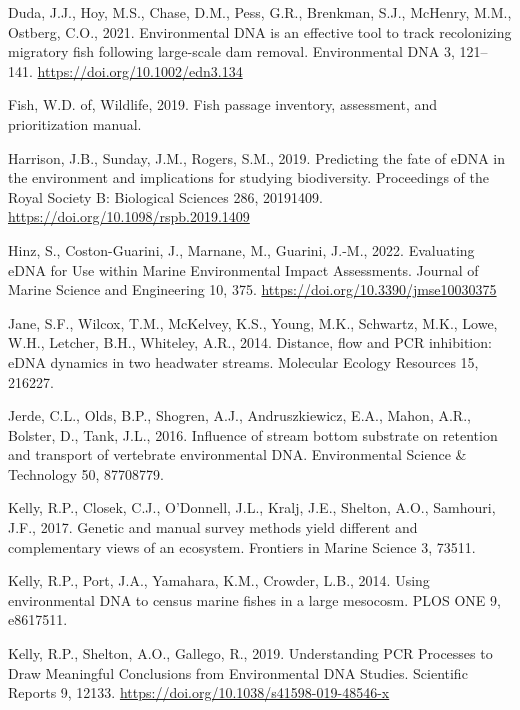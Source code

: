 \documentclass[
]{article}
\newlength{\cslhangindent}
\newlength{\cslentryspacingunit} %
\newenvironment{CSLReferences}[2] %
 {%
  \setlength{\parindent}{0pt}
  \ifodd #1
  \let\oldpar\par
  \def\par{\hangindent=\cslhangindent\oldpar}
  \fi
  \setlength{\parskip}{#2\cslentryspacingunit}
 }%
 {}
\begin{document}
\begin{CSLReferences}{1}{0}
\leavevmode{}%
Duda, J.J., Hoy, M.S., Chase, D.M., Pess, G.R., Brenkman, S.J., McHenry,
M.M., Ostberg, C.O., 2021. Environmental DNA is an effective tool to
track recolonizing migratory fish following large-scale dam removal.
Environmental DNA 3, 121--141. \url{https://doi.org/10.1002/edn3.134}

\leavevmode{}%
Fish, W.D. of, Wildlife, 2019. Fish passage inventory, assessment, and
prioritization manual.

\leavevmode{}%
Harrison, J.B., Sunday, J.M., Rogers, S.M., 2019. Predicting the fate of
eDNA in the environment and implications for studying biodiversity.
Proceedings of the Royal Society B: Biological Sciences 286, 20191409.
\url{https://doi.org/10.1098/rspb.2019.1409}

\leavevmode{}%
Hinz, S., Coston-Guarini, J., Marnane, M., Guarini, J.-M., 2022.
Evaluating eDNA for Use within Marine Environmental Impact Assessments.
Journal of Marine Science and Engineering 10, 375.
\url{https://doi.org/10.3390/jmse10030375}

\leavevmode{}%
Jane, S.F., Wilcox, T.M., McKelvey, K.S., Young, M.K., Schwartz, M.K.,
Lowe, W.H., Letcher, B.H., Whiteley, A.R., 2014. Distance, flow and PCR
inhibition: eDNA dynamics in two headwater streams. Molecular Ecology
Resources 15, 216227.

\leavevmode{}%
Jerde, C.L., Olds, B.P., Shogren, A.J., Andruszkiewicz, E.A., Mahon,
A.R., Bolster, D., Tank, J.L., 2016. Influence of stream bottom
substrate on retention and transport of vertebrate environmental DNA.
Environmental Science \& Technology 50, 87708779.

\leavevmode{}%
Kelly, R.P., Closek, C.J., O'Donnell, J.L., Kralj, J.E., Shelton, A.O.,
Samhouri, J.F., 2017. Genetic and manual survey methods yield different
and complementary views of an ecosystem. Frontiers in Marine Science 3,
73511.

\leavevmode{}%
Kelly, R.P., Port, J.A., Yamahara, K.M., Crowder, L.B., 2014. Using
environmental DNA to census marine fishes in a large mesocosm. PLOS ONE
9, e8617511.

\leavevmode{}%
Kelly, R.P., Shelton, A.O., Gallego, R., 2019. Understanding PCR
Processes to Draw Meaningful Conclusions from Environmental DNA Studies.
Scientific Reports 9, 12133.
\url{https://doi.org/10.1038/s41598-019-48546-x}


\end{CSLReferences}
\end{document}
